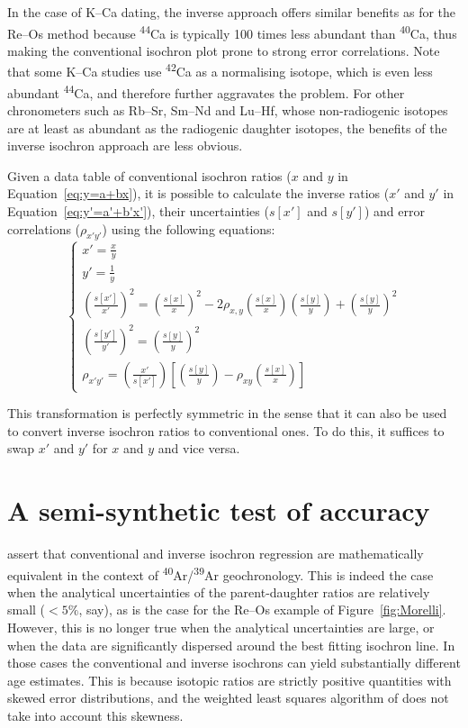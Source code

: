 \documentclass[]{article}
\begin{document}
In the case of K--Ca dating, the inverse approach offers similar
benefits as for the Re--Os method because \textsuperscript{44}Ca is
typically 100 times less abundant than \textsuperscript{40}Ca, thus
making the conventional isochron plot prone to strong error
correlations. Note that some K--Ca studies use \textsuperscript{42}Ca
as a normalising isotope, which is even less abundant
\textsuperscript{44}Ca, and therefore further aggravates the
problem. For other chronometers such as Rb--Sr, Sm--Nd and Lu--Hf,
whose non-radiogenic isotopes are at least as abundant as the
radiogenic daughter isotopes, the benefits of the inverse isochron
approach are less obvious.

Given a data table of conventional isochron ratios ($x$ and $y$ in
Equation~\ref{eq:y=a+bx}), it is possible to calculate the inverse
ratios ($x'$ and $y'$ in Equation~\ref{eq:y'=a'+b'x'}), their
uncertainties ($s[x']$ and $s[y']$) and error correlations
($\rho_{x'y'}$) using the following equations:
\begin{equation}
  \begin{cases}
    x' = \frac{x}{y} \\
    y' = \frac{1}{y} \\
    \left(\frac{s[x']}{x'}\right)^2 =
    \left(\frac{s[x]}{x}\right)^2 -
    2 \rho_{x,y}\left(\frac{s[x]}{x}\right)\left(\frac{s[y]}{y}\right) +
    \left(\frac{s[y]}{y}\right)^2 \\
    \left(\frac{s[y']}{y'}\right)^2 = \left(\frac{s[y]}{y}\right)^2 \\
    \rho_{x'y'} =
    \left(\frac{x'}{s[x']}\right)
    \left[
    \left(\frac{s[y]}{y}\right) -
    \rho_{xy}\left(\frac{s[x]}{x}\right)
    \right]
  \end{cases}
  \label{eq:transformation}
\end{equation}

This transformation is perfectly symmetric in the sense that it can
also be used to convert inverse isochron ratios to conventional
ones. To do this, it suffices to swap $x'$ and $y'$ for $x$ and $y$
and vice versa.

\section{A semi-synthetic test of accuracy}

\citet{dalrymple1988} assert that conventional and inverse isochron
regression are mathematically equivalent in the context of
\textsuperscript{40}Ar/\textsuperscript{39}Ar geochronology.  This is
indeed the case when the analytical uncertainties of the
parent-daughter ratios are relatively small ($<5\%$, say), as is the
case for the Re--Os example of Figure~\ref{fig:Morelli}. However, this
is no longer true when the analytical uncertainties are large, or when
the data are significantly dispersed around the best fitting isochron
line. In those cases the conventional and inverse isochrons can yield
substantially different age estimates. This is because isotopic ratios
are strictly positive quantities with skewed error distributions, and
the weighted least squares algorithm of \citet{york2004} does not take
into account this skewness.
\end{document}
